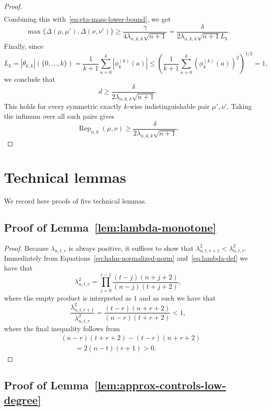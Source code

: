 \documentclass[manuscript,nonacm]{acmart}
\begin{document}
\begin{proof}
\[\begin{aligned}
\end{aligned}
\]
Combining this with~\eqref{eq:eta-mass-lower-bound}, we get
\[
    \max\{\Delta(\mu,\mu'),\Delta(\nu,\nu')\}
    \ge
    \frac{\gamma}{4\lambda_{n,k,k}\sqrt{n+1}}
    =
    \frac{\delta}{2\lambda_{n,k,k}\sqrt{n+1}L_k}.
\]
Finally, since
\[
    L_k
    =
    |\theta_{k,k}|(\{0,\dots,k\})
    =
    \frac{1}{k+1}\sum_{a=0}^k |\phi_k^{(k)}(a)|
    \le
    \left(
        \frac{1}{k+1}\sum_{a=0}^k (\phi_k^{(k)}(a))^2
    \right)^{1/2}
    =
    1,
\]
we conclude that
\[
    d
    \ge
    \frac{\delta}{2\lambda_{n,k,k}\sqrt{n+1}}.
\]
This holds for every symmetric exactly \(k\)-wise indistinguishable pair
\(\mu',\nu'\). Taking the infimum over all such pairs gives
\[
    \operatorname{Rep}_{n,k}(\mu,\nu)
    \ge
    \frac{\delta}{2\lambda_{n,k,k}\sqrt{n+1}}.
\]
\end{proof}








\appendix
\section{Technical lemmas}
We record here proofs of five technical lemmas.
\subsection{Proof of Lemma~\ref{lem:lambda-monotone}}
\begin{proof}
Because $\lambda_{n,t,r}$ is always positive, it suffices to show that $\lambda_{n,t,r+1}^{2}<\lambda_{n,t,r}^{2}$. Immediately from Equations~\ref{eq:hahn-normalized-norm} and~\ref{eq:lambda-def} we have that
\[
    \lambda_{n,t,r}^{2}
    =
    \prod_{j=0}^{r-1}
    \frac{(t-j)(n+j+2)}{(n-j)(t+j+2)},
\]
where the empty product is interpreted as \(1\) and as such we have that 
\[
    \frac{\lambda_{n,t,r+1}^{2}}{\lambda_{n,t,r}^{2}}=\frac{(t-r)(n+r+2)}{(n-r)(t+r+2)}<1,
\]
where the final inequality follows from
\[
\begin{aligned}
    &(n-r)(t+r+2) - (t-r)(n+r+2)  \\
    &\qquad =
    2(n-t)(r+1)>0.
\end{aligned}
\]
\end{proof}

\subsection{Proof of Lemma~\ref{lem:approx-controls-low-degree}}
\end{document}
